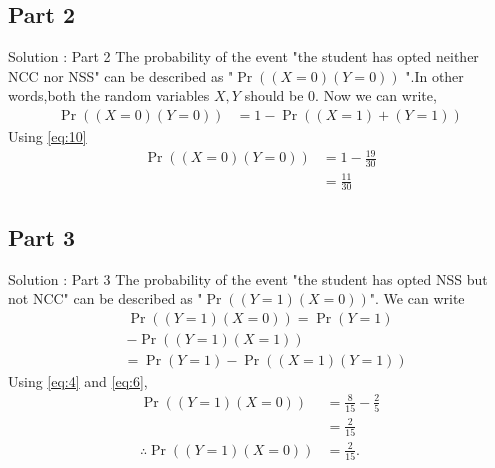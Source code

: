 \documentclass{beamer}
\providecommand{\pr}[1]{\ensuremath{\Pr\left(#1\right)}}
\providecommand{\brak}[1]{\ensuremath{\left(#1\right)}}
\begin{document}
\subsection{Part 2}

\begin{frame}{Solution : Part 2}
       The probability of the event "the student has opted neither NCC nor NSS" can be described as "$ \pr{\brak{X=0}\brak{Y=0}}$ ".In other words,both the random variables $X,Y$ should be 0.  
                 Now we can write,
          \begin{align}
                  \pr{\brak{X=0}\brak{Y=0}} &= 1 - \pr{\brak{X = 1} + \brak{Y = 1}}
          \end{align}
                Using \eqref{eq:10}
          \begin{align}
	          \pr{\brak{X=0}\brak{Y=0}} &= 1 - \frac{19}{30}\\
                                            &= \frac{11}{30}                        
          \end{align}
\end{frame}
\subsection{Part 3}

\begin{frame}{Solution : Part 3}
       The probability of the event "the student has opted NSS but not NCC" can be described as  "$ \pr{\brak{Y=1}\brak{ X = 0}}$". 
                We can write 
          \begin{equation}
             \begin{split}
                \pr{\brak{Y=1}\brak{ X = 0}} = \pr{Y = 1} \\
                                                  - \pr{\brak{Y = 1}\brak{X = 1}}
             \end{split}
          \end{equation}
          \begin{align}
                            &= \pr{Y = 1} -  \pr{\brak{X = 1}\brak{Y=1}}
          \end{align}
       Using \eqref{eq:4} and \eqref{eq:6},
          \begin{align}
	        \pr{\brak{Y=1}\brak{ X = 0}}  &= \frac{8}{15} -  \frac{2}{5}\\
                                              & = \frac{2}{15}\\
                \therefore  \pr{\brak{Y=1}\brak{ X = 0}} &= \frac{2}{15}.
          \end{align}
\end{frame}
\end{document}
